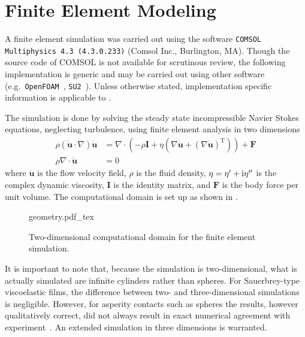 \section{Finite Element Modeling}\label{sec:finiteelementdingus}
A finite element simulation was carried out using the software
\texttt{COMSOL Multiphysics 4.3 (4.3.0.233)} (Comsol Inc., Burlington, MA).
Though the source code of COMSOL is not available for scrutinous review,
the following implementation is generic and may be carried out using other
software (e.g.\ \texttt{OpenFOAM}~\cite{jasak2007openfoam},
\texttt{SU2}~\cite{palacios2013stanford}).  Unless otherwise stated,
implementation specific information is applicable to \comsol.

The simulation is done by solving the steady state incompressible Navier
Stokes equations, neglecting turbulence, using finite element analysis in
two dimensions
\begin{align}
  \rho\left(\mathbf{\dot{u}}\cdot \nabla\right)\mathbf{\dot{u}}
                                     & =\nabla \cdot {\left( -\rho \mathbf{I} + \eta \left(\nabla \mathbf{\dot{u}} +
    {\left( \nabla \mathbf{\dot{u}}\right)}^\mathrm{T}\right)\right)} + \mathbf{F}                                   \\
  \rho \nabla \cdot \mathbf{\dot{u}} & = 0
\end{align}
where $\mathbf{\dot{u}}$ is the flow velocity field, $\rho$ is the fluid
density, $\eta = \eta^\prime + {\mathrm{i}}\eta^{\prime\prime}$ is the complex
dynamic viscosity, $\mathbf{I}$ is the identity matrix, and $\mathbf{F}$ is
the body force per unit volume.  The computational domain is set up as
shown in .
\begin{figure}[h]
  \centering
  {geometry.pdf_tex}
  \caption{Two-dimensional computational domain for the finite element simulation.}
  \label{fig:compgeometry}
\end{figure}

It is important to note that, because the simulation is two-dimensional, what
is actually simulated are infinite cylinders rather than spheres.  For
Sauerbrey-type viscoelastic films, the difference between two- and
three-dimensional simulations is negligible.  However, for asperity contacts
such as spheres the results, however qualitatively correct, did not always
result in exact numerical agreement with experiment~\cite{Vittorias2010489}.
An extended simulation in three dimensions is warranted.

